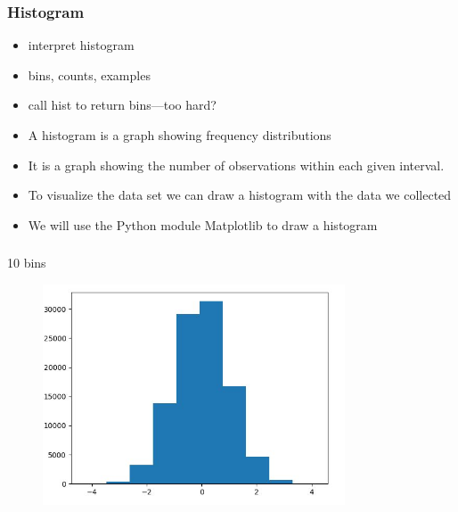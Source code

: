 \documentclass[english,14pt]{beamer}
\begin{document}

\begin{frame}[fragile]

\frametitle{Histogram}

\begin{itemize}
	\item interpret histogram
	\item bins, counts, examples
	\item call hist to return bins---too hard?
\end{itemize}

\begin{itemize}
	\item A histogram is a graph showing frequency distributions
	\item It is a graph showing the number of observations within each given interval.
	\item To visualize the data set we can draw a histogram with the data we collected
	\item We will use the Python module Matplotlib to draw a histogram
\end{itemize}

\end{frame}


\begin{frame}[fragile]

\frametitle{}

10 bins
\begin{figure}[ht]
	\centering
	\includegraphics[width=0.8\textwidth]{figures/hist10BinsExample}
\end{figure}

\end{frame}
\end{document}
